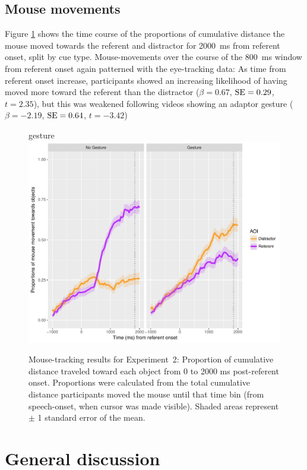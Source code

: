 \documentclass[a4paper,man,natbib]{apa6}
\newcommand{\resultsLM}[3]{$\beta = #1$, $\textnormal{SE} = #2$, $t #3$}
\begin{document}
\subsection{Mouse movements}
Figure \ref{fig:v2_mouse} shows the time course of the proportions of cumulative distance the mouse moved towards the referent and distractor for 2000~ms from referent onset, split by cue type.
Mouse-movements over the course of the 800~ms window from referent onset again patterned with the eye-tracking data:
As time from referent onset increase, participants showed an increasing likelihood of having moved more toward the referent than the distractor (\resultsLM{0.67}{0.29}{=2.35}), but this was weakened following videos showing an adaptor gesture (\resultsLM{-2.19}{0.64}{=-3.42})


\begin{figure}[Ht]gesture
  \centering
	\includegraphics[width=\linewidth]{./img/e8_mouset.pdf}
  \caption{Mouse-tracking results for Experiment~2: Proportion of cumulative distance traveled toward each object from 0 to 2000 ms post-referent onset. Proportions were calculated from the total cumulative distance participants moved the mouse until that time bin (from speech-onset, when cursor was made visible). Shaded areas represent $\pm$ 1 standard error of the mean.}
  \label{fig:v2_mouse}
\end{figure}

\section{General discussion}
\end{document}
